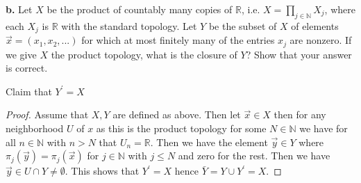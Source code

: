 \documentclass{amsart}
\theoremstyle{plain}
\theoremstyle{definition}
\theoremstyle{remark}
\begin{document}
{\bfseries b.} Let $X$ be the product of countably many copies of $\mathbb R$, i.e. $X = \prod _{j\in \mathbb N } X_j$, where each $X_j$ is $\mathbb R$ with the standard topology. Let $Y$ be the subset of $X$ of elements $\vec{x} = ( x_1 , x_2 , . . . )$ for which at most finitely many of the entries $x_j$ are nonzero. If we give $X$ the product topology, what is the closure of $Y$? Show that your answer is correct. 


Claim that $Y^\prime=X$
\begin{proof}
    Assume that $X,Y$ are defined as above. Then let $\vec{x} \in X$ then for any neighborhood $U$ of $x$ as this is the product topology for some $N\in \mathbb{N}$ we have for all $n\in \mathbb{N}$ with $n>N$ that $U_n=\mathbb{R}$. Then we have the element $\vec{y} \in Y$ where $\pi_j(\vec{y})=\pi_j(\vec{x})$ for $j\in \mathbb{N}$ with $j\leq N$ and zero for the rest. Then we have $\vec{y}\in U\cap Y\not = \emptyset$. This shows that $Y^\prime=X$ hence $\bar Y=Y\cup Y^\prime = X$. 
\end{proof}

 
\end{document}
